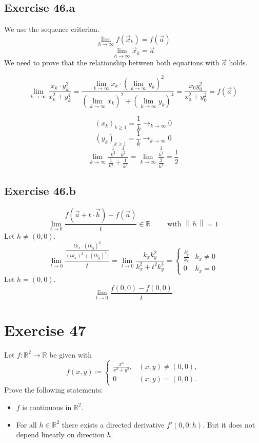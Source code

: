 \documentclass[a4paper]{article}
\theoremstyle{definition}
\newcommand\norm[1]{\left\|\,#1\,\right\|}
\begin{document}
\subsection{Exercise 46.a}

We use the sequence criterion.
\[ \lim_{h\to\infty} f(\vec{x}_k) = f(\vec{a}) \]
\[ \lim_{h\to\infty} \vec{x}_k = \vec{a} \]
We need to prove that the relationship between both equations with $\vec{a}$ holds.

\[
  \lim_{k\to\infty} \frac{x_k \cdot y_k^2}{x_k^2 + y_k^4}
  = \frac{\lim_{k\to\infty} x_k \cdot (\lim_{k\to\infty} y_k)^2}{(\lim_{k\to\infty} x_k)^2 + (\lim_{k\to\infty} y_k)^4}
  = \frac{x_0 y_0^2}{x_0^2 + y_0^2} = f(\vec{a})
\]

\[ (x_k)_{k \geq 1} = \frac{1}{k} \to_{k\to\infty} 0 \]
\[ (y_k)_{k \geq 1} = \frac{1}{k} \to_{k\to\infty} 0 \]
\[ \lim_{k\to\infty} \frac{\frac{1}{k^2} \cdot \frac{1}{k^2}}{\frac{1}{k^4} + \frac{1}{k^4}}
= \lim_{k\to\infty} \frac{\frac{1}{k^4}}{\frac{2}{k^4}} = \frac12
\]

\subsection{Exercise 46.b}

\[
  \lim_{t\to 0} \frac{f(\vec{a} + t \cdot \vec{h}) - f(\vec{a})}{t} \in \mathbb R
  \qquad \text{ with } \norm{h} = 1
\]
Let $h \neq (0, 0)$.
\[
  \lim_{t\to 0} \frac{\frac{tk_x \cdot (tk_y)^2}{(tk_x)^2 + (t k_y)^4)}}{t}
  = \lim_{t\to0} \frac{k_x k_y^2}{k_x^2 + t^2 k_y^4}
  = \begin{cases}
    \frac{k_y^2}{k_x}  & k_x \neq 0 \\
    0 & k_x = 0
  \end{cases}
\]
Let $h = (0, 0)$.
\[
\lim_{t \to 0} \frac{f(0,0) - f(0,0)}{t}
\]

\section{Exercise 47}
\begin{ex}
  Let $f: \mathbb R^2 \to \mathbb R$ be given with
  \[
  f(x,y) \coloneqq \begin{cases}
    \frac{x^3}{x^2 + y^2}, & (x,y) \neq (0,0), \\
    0 & (x,y) = (0, 0).
  \end{cases}
  \]
  Prove the following statements:
  \begin{itemize}
  \item $f$ is continuous in $\mathbb R^2$.
  \item For all $h \in \mathbb R^2$ there exists a directed derivative $f'(0,0;h)$.
    But it does not depend linearly on direction $h$.
  \end{itemize}
\end{ex}
\end{document}
